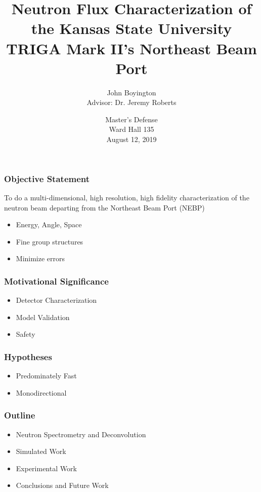 \documentclass[fleqn]{beamer}
\title[KSU Beam Characterization]{Neutron Flux Characterization of the Kansas State University TRIGA Mark II's Northeast Beam Port}
\author[John Boyington]{
    John Boyington\\
    Advisor: Dr. Jeremy Roberts}
\institute[Kansas State University]{
    Department of Mechanical and Nuclear Engineering \\
    Kansas State University}
\date[Master's Defense]{
    Master's Defense\\
    Ward Hall 135\\
    August 12, 2019}
\begin{document}
\newcommand{\beginbackup}{
    \newcounter{framenumbervorappendix}
    \setcounter{framenumbervorappendix}{\value{framenumber}}
}
\newcommand{\backupend}{
    \addtocounter{framenumbervorappendix}{-\value{framenumber}}
    \addtocounter{framenumber}{\value{framenumbervorappendix}}
}



\begin{frame}
\titlepage
\end{frame}

\begin{frame}
\frametitle{Objective Statement}

To do a multi-dimensional, high resolution, high fidelity characterization of the neutron beam departing from the Northeast Beam Port (NEBP)
\begin{itemize}
\item Energy, Angle, Space
\item Fine group structures
\item Minimize errors
\end{itemize}

\end{frame}

\begin{frame}
\frametitle{Motivational Significance}

\begin{itemize}
\item Detector Characterization
\item Model Validation
\item Safety
\end{itemize}

\end{frame}

\begin{frame}
\frametitle{Hypotheses}

\begin{itemize}
\item Predominately Fast
\item Monodirectional
\end{itemize}

\end{frame}

\begin{frame}
\frametitle{Outline}
\begin{itemize}
\item Neutron Spectrometry and Deconvolution
\item Simulated Work
\item Experimental Work
\item Conclusions and Future Work
\end{itemize}
\end{frame}
\end{document}
